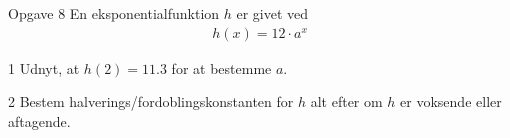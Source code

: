 \documentclass[12pt,x11names,a4paper]{article}
\begin{document}
\newpage
\begin{opgavetekst}{Opgave 8}
	En eksponentialfunktion $h$ er givet ved
	\begin{align*}
		h(x) = 12\cdot a^x
	\end{align*}
\end{opgavetekst}
\begin{delopgave}{}{1}
	Udnyt, at $h(2) = 11.3$ for at bestemme $a$.
\end{delopgave}
\begin{delopgave}{}{2}
	Bestem halverings/fordoblingskonstanten for $h$ alt efter om $h$ er voksende eller aftagende. 
\end{delopgave}
\end{document}
